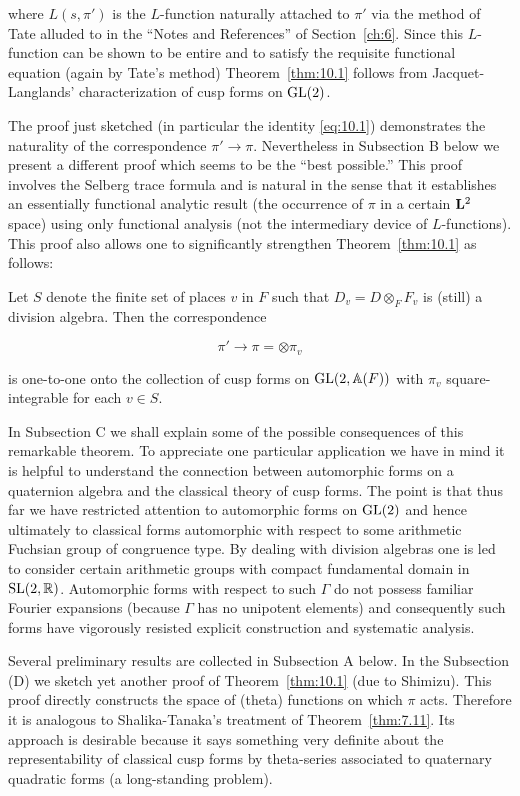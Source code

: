 where $L(s, \pi')$ is the $L$-function naturally attached to $\pi'$ via the method of Tate alluded to in the ``Notes and References'' of Section~\ref{ch:6}. Since this $L$-function can be shown to be entire and to satisfy the requisite functional equation (again by Tate's method) Theorem~\ref{thm:10.1} follows from Jacquet-Langlands' characterization of cusp forms on $\operatorname{GL}(2)$.

The proof just sketched (in particular the identity \eqref{eq:10.1}) demonstrates the naturality of the correspondence $\pi' \to \pi$. Nevertheless in Subsection B below we present a different proof which seems to be the ``best possible.'' This proof involves the Selberg trace formula and is natural in the sense that it establishes an essentially functional analytic result (the occurrence of $\pi$ in a certain $\mathbf{L}^2$ space) using only functional analysis (not the intermediary device of $L$-functions). This proof also allows one to significantly strengthen Theorem~\ref{thm:10.1} as follows:

\begin{theorem}\label{thm:10.2}

Let $S$ denote the finite set of places $v$ in $F$ such that $D_v = D \otimes_F F_v$ is (still) a division algebra. Then the correspondence

\[
\pi' \to \pi = \otimes \pi_v
\]

is one-to-one onto the collection of cusp forms on $\operatorname{GL}(2, \mathbb{A}(F))$ with $\pi_v$ square-integrable for each $v \in S$.

\end{theorem}

In Subsection C we shall explain some of the possible consequences of this remarkable theorem. To appreciate one particular application we have in mind it is helpful to understand the connection between automorphic forms on a quaternion algebra and the classical theory of cusp forms. The point is that thus far we have restricted attention to automorphic forms on $\operatorname{GL}(2)$ and hence ultimately to classical forms automorphic with respect to some arithmetic Fuchsian group of congruence type. By dealing with division algebras one is led to consider certain arithmetic groups with compact fundamental domain in $\operatorname{SL}(2, \mathbb{R})$. Automorphic forms with respect to such $\Gamma$ do not possess familiar Fourier expansions (because $\Gamma$ has no unipotent elements) and consequently such forms have vigorously resisted explicit construction and systematic analysis.

Several preliminary results are collected in Subsection A below. In the Subsection (D) we sketch yet another proof of Theorem~\ref{thm:10.1} (due to Shimizu). This proof directly constructs the space of (theta) functions on which $\pi$ acts. Therefore it is analogous to Shalika-Tanaka's treatment of Theorem~\ref{thm:7.11}. Its approach is desirable because it says something very definite about the representability of classical cusp forms by theta-series associated to quaternary quadratic forms (a long-standing problem).

